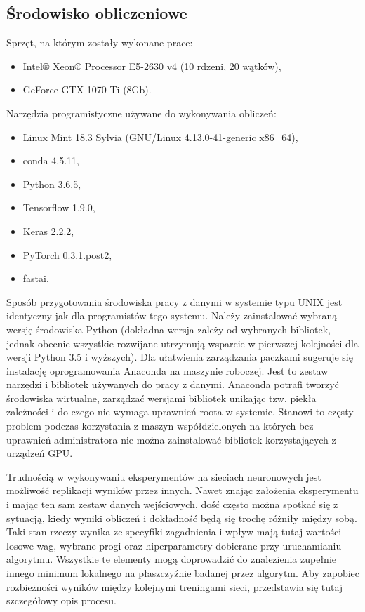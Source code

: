 \documentclass[12pt,a4paper,twoside,titlepage,openright]{book}
\begin{document}
\begin{itemize}
\subsection{Środowisko obliczeniowe}
Sprzęt, na którym zostały wykonane prace:
\begin{itemize}
\item Intel® Xeon® Processor E5-2630 v4 (10 rdzeni, 20 wątków),
\item GeForce GTX 1070 Ti (8Gb).
\end{itemize}

Narzędzia programistyczne używane do wykonywania obliczeń:
\begin{itemize}
\item Linux Mint 18.3 Sylvia (GNU/Linux 4.13.0-41-generic x86\_64),
\item conda 4.5.11,
\item Python 3.6.5,
\item Tensorflow 1.9.0,
\item Keras 2.2.2,
\item PyTorch 0.3.1.post2,
\item fastai.
\end{itemize}

Sposób przygotowania środowiska pracy z danymi w systemie typu UNIX jest identyczny jak dla programistów tego systemu. Należy zainstalować wybraną wersję środowiska Python (dokładna wersja zależy od wybranych bibliotek, jednak obecnie wszystkie rozwijane utrzymują wsparcie w pierwszej kolejności dla wersji Python 3.5 i wyższych). Dla ułatwienia zarządzania paczkami sugeruje się instalację oprogramowania Anaconda na maszynie roboczej. Jest to zestaw narzędzi i bibliotek używanych do pracy z danymi. Anaconda potrafi tworzyć środowiska wirtualne, zarządzać wersjami bibliotek unikając tzw. piekła zależności i do czego nie wymaga uprawnień roota w systemie. Stanowi to częsty problem podczas korzystania z maszyn współdzielonych na których bez uprawnień administratora nie można zainstalować bibliotek korzystających z urządzeń GPU.

Trudnością  w wykonywaniu eksperymentów na sieciach neuronowych jest możliwość replikacji wyników przez innych. Nawet znając założenia eksperymentu i mając ten sam zestaw danych wejściowych, dość często można spotkać się z sytuacją, kiedy wyniki obliczeń i dokładność będą się trochę różniły między sobą. Taki stan rzeczy wynika ze specyfiki zagadnienia i wpływ mają tutaj wartości losowe wag, wybrane progi oraz hiperparametry dobierane przy uruchamianiu algorytmu. Wszystkie te elementy mogą doprowadzić do znalezienia zupełnie innego minimum lokalnego na płaszczyźnie badanej przez algorytm. Aby zapobiec rozbieżności wyników między kolejnymi treningami sieci, przedstawia się tutaj szczegółowy opis procesu.


\end{itemize}
\end{document}
